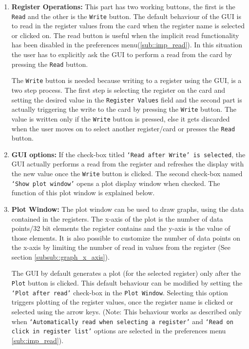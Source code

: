 \begin{enumerate}
\item \textbf{Register Operations:} \label{itm:Register_Operations} This part has two working buttons, the first is the \texttt{Read} and the other is the \texttt{Write} button. The default behaviour of the GUI is to read in the register values from the card when the register name is selected or clicked on. The read button is useful when the implicit read functionality has been disabled in the preferences menu(\ref{sub::imp_read}). In this situation the user has to explicitly ask the GUI to perform a read from the card by pressing the \texttt{Read} button.

The \texttt{Write} button is needed because writing to a register using the GUI, is a two step process. The first step is selecting the register on the card and setting the desired value in the \texttt{Register Values} field and the second part is actually triggering the write to the card by pressing the \texttt{Write} button. The value is written only if the \texttt{Write} button is pressed, else it gets discarded when the user moves on to select another register/card or presses the \texttt{Read} button. 

\item \textbf{GUI options:} If the check-box titled \texttt{`Read after Write' is selected}, the GUI actually performs a read from the register and refreshes the display with the new value once the \texttt{Write} button is clicked. The second check-box named \texttt{`Show plot window'} opens a plot display window when checked. The function of this  plot window is explained below.

\item \textbf{Plot Window:} The plot window can be used to draw graphs, using the data contained in the registers. The x-axis of the plot is the number of data points/32 bit elements the register contains and the y-axis is the value of those elements. It is also possible to customize the number of data points on the x-axis by limiting the number of read in values from the register (See section \ref{subsub::graph_x_axis}).

The GUI by default generates a plot (for the selected register) only after the \texttt{Plot} button is clicked. This default behaviour can be modified by setting the \texttt{`Plot after read'} check-box in the \texttt{Plot Window}. Selecting this option triggers plotting of the register values, once the register name is clicked or selected using the arrow keys. (Note: This behaviour works as described only when \texttt{`Automatically read when selecting a register'} and \texttt{`Read on click in register list'} options are selected in the preferences menu \ref{sub::imp_read}).
	

\end{enumerate}
